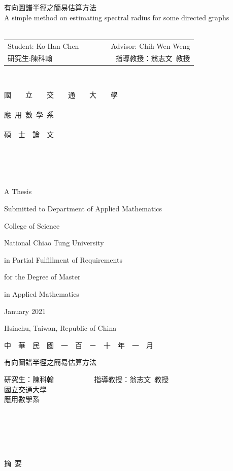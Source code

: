 \documentclass[12pt, a4paper]{article}
\theoremstyle{plain}
\theoremstyle{definition}
\begin{document}
\renewcommand{\baselinestretch}{2} %
\thispagestyle{empty}
\begin{center}
{
\Large
有向圖譜半徑之簡易估算方法\\
A simple method on estimating spectral radius for some directed graphs\\~\\
\begin{tabular}{lccr}
Student: Ko-Han Chen  &&~~~& Advisor: Chih-Wen Weng\\
研究生:陳科翰　 &&~~~& 指導教授：翁志文~教授
\end{tabular}
}~\\

\bigskip

\renewcommand{\baselinestretch}{1} %

{ \LARGE 國~~~~立~~~~交~~~~通~~~~大~~~~學}\\~\\
{ \LARGE 應~用~數~學~系}\\~\\
{ \LARGE 碩~~士~~論~~文}\\~\\~\\~\\~\\
\renewcommand{\baselinestretch}{1} %
{ \large A Thesis

Submitted to Department of Applied Mathematics

College of Science

National Chiao Tung University

in Partial Fulfillment of Requirements

for the Degree of Master

in Applied Mathematics
\bigskip \medskip

January 2021

Hsinchu, Taiwan, Republic of China \bigskip \medskip

 中~~華~~民~~國~~一~~百~~ㄧ~~十~~年~~一~~月 }
\end{center}
\pagebreak

\label{abstract}

\begin{center}
{  \LARGE
有向圖譜半徑之簡易估算方法
\bigskip\bigskip\bigskip

研究生：陳科翰  ~~~~~~~~~~ 指導教授：翁志文~教授 \\
國立交通大學  \\
\bigskip
應用數學系
\bigskip\bigskip\bigskip\bigskip
} \\~\\~\\~\\
{\large 摘~要}
\end{center}
 \bigskip
\end{document}
